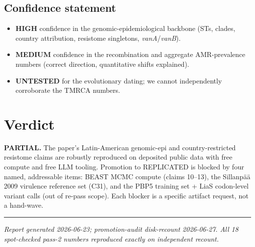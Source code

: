 \documentclass[11pt,letterpaper]{article}
\begin{document}
\subsection{Confidence statement}
\begin{itemize}[leftmargin=1.2em]
  \item \textbf{HIGH} confidence in the genomic-epidemiological backbone (STs, clades, country attribution, resistome singletons, \emph{vanA}/\emph{vanB}).
  \item \textbf{MEDIUM} confidence in the recombination and aggregate AMR-prevalence numbers (correct direction, quantitative shifts explained).
  \item \textbf{UNTESTED} for the evolutionary dating; we cannot independently corroborate the TMRCA numbers.
\end{itemize}

\section{Verdict}
\textbf{PARTIAL.} The paper's Latin-American genomic-epi and country-restricted resistome claims are robustly reproduced on deposited public data with free compute and free LLM tooling. Promotion to REPLICATED is blocked by four named, addressable items: BEAST MCMC compute (claims 10--13), the Sillanp\"a\"a 2009 virulence reference set (C31), and the PBP5 training set + LiaS codon-level variant calls (out of re-pass scope). Each blocker is a specific artifact request, not a hand-wave.

\vspace{1em}
\hrule
\vspace{0.5em}
\noindent\emph{Report generated 2026-06-23; promotion-audit disk-recount 2026-06-27. All 18 spot-checked pass-2 numbers reproduced exactly on independent recount.}
\end{document}

